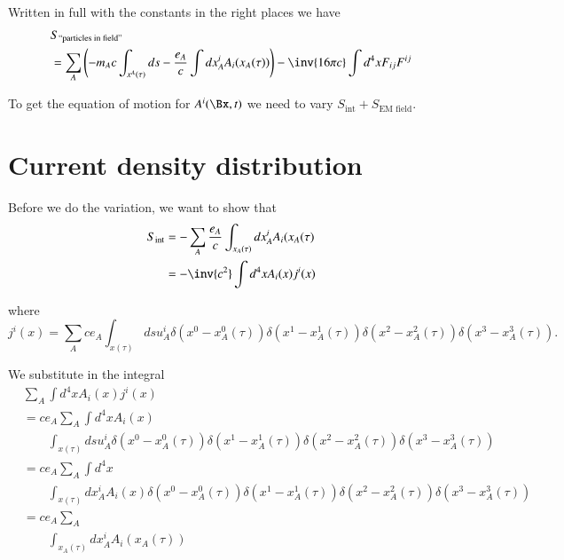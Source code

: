 Written in full with the constants in the right places we have
%
\begin{equation}\label{eqn:relativisticElectrodynamicsL12b:370}
\begin{aligned}
&S_{\text{``particles in field''}} \\
&= \sum_A \left( -m_A c \int_{x^A(\tau)} ds - \frac{e_A}{c} \int dx^i_A A_i(x_A(\tau))
\right)
- \inv{16 \pi c} \int d^4 x F_{ij} F^{ij}
\end{aligned}
\end{equation}

To get the equation of motion for \(A^i(\Bx, t)\) we need to vary \(S_{\text{int}} + S_{\text{EM field}}\).

\section{Current density distribution}

Before we do the variation, we want to show that
%
\begin{equation}\label{eqn:relativisticElectrodynamicsL12b:590}
\begin{aligned}
S_{\text{int}}
&= -\sum_A \frac{e_A}{c} \int_{x_A(\tau)} dx^i_A A_i(x_A(\tau) \\
&= -\inv{c^2} \int d^4 x A_i(x) j^i(x)
\end{aligned}
\end{equation}

where
%
\begin{equation}\label{eqn:relativisticElectrodynamicsL12b:390}
j^i(x) =
\sum_A c e_A \int_{x(\tau)}
ds u^i_A
\delta(x^0 - x^0_A(\tau))
\delta(x^1 - x^1_A(\tau))
\delta(x^2 - x^2_A(\tau))
\delta(x^3 - x^3_A(\tau)).
\end{equation}

We substitute in the integral
%
\begin{equation}\label{eqn:relativisticElectrodynamicsL12b:610}
\begin{aligned}
&\sum_A \int d^4 x A_i(x) j^i(x) \\
&=
c e_A \sum_A \int d^4 x A_i(x) \\
&\qquad \int_{x(\tau)}
ds u^i_A
\delta(x^0 - x^0_A(\tau))
\delta(x^1 - x^1_A(\tau))
\delta(x^2 - x^2_A(\tau))
\delta(x^3 - x^3_A(\tau)) \\
&=
c e_A \sum_A
\int d^4 x \\
&\qquad \int_{x(\tau)}
dx^i_A
A_i(x)
\delta(x^0 - x^0_A(\tau))
\delta(x^1 - x^1_A(\tau))
\delta(x^2 - x^2_A(\tau))
\delta(x^3 - x^3_A(\tau)) \\
&=
c e_A \sum_A \\
&\qquad \int_{x_A(\tau)}
dx^i_A
A_i(x_A(\tau))
\end{aligned}
\end{equation}

